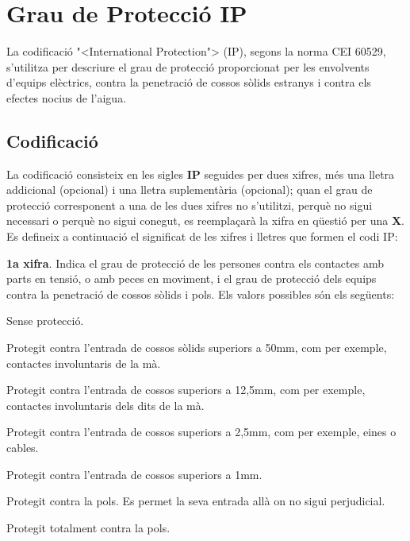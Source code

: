 \chapter{Grau de Protecci\'{o} IP}   

La codificaci\'{o} {"<}International Protection{">} (\textsf{IP}), segons la
norma \textsf{CEI 60529}, s'utilitza per descriure el grau de
protecci\'{o}  proporcionat per les envolvents d'equips el\`{e}ctrics, contra
la penetraci\'{o} de cossos s\`{o}lids estranys i contra els efectes nocius
de l'aigua.

\section{Codificaci\'{o}}
 La codificaci\'{o} consisteix en les sigles \textsf{\textbf{IP}}
seguides per dues xifres, m\'{e}s una lletra addicional (opcional) i una
lletra suplement\`{a}ria (opcional); quan el grau de protecci\'{o}
corresponent a una de les dues xifres no s'utilitzi, perqu\`{e} no sigui
necessari o perqu\`{e} no sigui conegut, es reempla\c{c}ar\`{a} la xifra en
q\"{u}esti\'{o} per una \textsf{\textbf{X}}. Es defineix a continuaci\'{o} el
significat de les xifres i lletres que formen el codi \textsf{IP}:

\textbf{1a xifra}. Indica el grau de protecci\'{o} de les persones contra els contactes amb
parts en tensi\'{o}, o amb peces en moviment, i el grau de protecci\'{o} dels equips contra la
penetraci\'{o} de cossos s\`{o}lids i pols. Els valors possibles s\'{o}n els seg\"{u}ents:
\begin{multicols}{2}
\begin{list}{}
   {\setlength{\labelwidth}{4.5mm} \setlength{\leftmargin}{4.5mm} \setlength{\labelsep}{2mm}}
   \item[\textbf{0}] Sense protecci\'{o}.
   \item[\textbf{1}] Protegit contra l'entrada de cossos s\`{o}lids superiors a 50\unit{mm},
   com per exemple,   contactes involuntaris de la m\`{a}.
   \item[\textbf{2}] Protegit contra l'entrada de cossos superiors a 12,5\unit{mm}, com per exemple,
   contactes involuntaris dels dits de la m\`{a}.
   \item[\textbf{3}] Protegit contra l'entrada de cossos superiors a 2,5\unit{mm},
   com per exemple, eines o cables.
   \item[\textbf{4}] Protegit contra l'entrada de cossos superiors a 1\unit{mm}.
   \item[\textbf{5}] Protegit contra la pols. Es permet la seva entrada all\`{a} on no sigui perjudicial.
   \item[\textbf{6}] Protegit totalment contra la pols.
\end{list}
\end{multicols}

